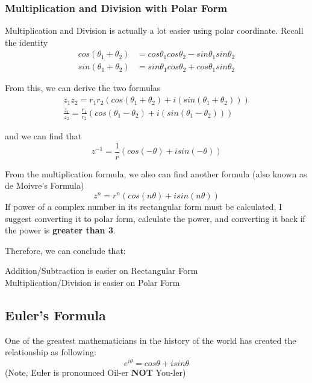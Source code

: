 \documentclass[12pt]{article}
\begin{document}
\subsubsection{Multiplication and Division with Polar Form}
Multiplication and Division is actually a lot easier using polar coordinate. Recall the identity
\begin{equation}
\begin{split}
cos(\theta_1+\theta_2) &= cos\theta_1cos\theta_2 - sin\theta_1sin\theta_2\\
sin(\theta_1+\theta_2) &= sin\theta_1cos\theta_2 + cos\theta_1sin\theta_2
\end{split}
\end{equation}

From this, we can derive the two formulas
\begin{equation}
\begin{split}
z_1z_2 = r_1r_2(cos(\theta_1+\theta_2) + i(sin(\theta_1+\theta_2)))\\
\frac{z_1}{z_2} = \frac{r_1}{r_2}(cos(\theta_1-\theta_2) + i(sin(\theta_1-\theta_2)))
\end{split}
\end{equation}

and we can find that 
\begin{equation}
z^{-1} = \frac{1}{r}(cos(-\theta) + isin(-\theta))
\end{equation}

From the multiplication formula, we also can find another formula (also known as de Moivre's Formula)
\begin{equation}
z^n = r^n(cos(n\theta) + isin(n\theta))
\end{equation}
If power of a complex number in its rectangular form must be calculated, I suggest converting it to polar form, calculate the power, and converting it back if the power is \textbf{greater than 3}.

Therefore, we can conclude that:\\
\begin{center}
Addition/Subtraction is easier on Rectangular Form\\
Multiplication/Division is easier on Polar Form
\end{center}

\subsection{Euler's Formula}
One of the greatest mathematicians in the history of the world has created the relationship as following:
\begin{equation}
e^{i\theta} = cos\theta + isin\theta
\end{equation}
(Note, Euler is pronounced Oil-er \textbf{NOT} You-ler)\\
\end{document}
